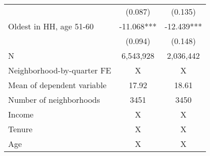 \begin{tabular}{lcc}
 & (0.087) & (0.135) \\ 
Oldest in HH, age 51-60 & -11.068*** & -12.439*** \\ 
 & (0.094) & (0.148) \\ 
 \midrule
N & 6,543,928 & 2,036,442 \\ 
Neighborhood-by-quarter FE & X & X \\ 
Mean of dependent variable & 17.92 & 18.61 \\ 
Number of neighborhoods & 3451 & 3450 \\ 
Income & X & X \\ 
Tenure & X & X \\ 
Age & X & X \\ 
\bottomrule
\end{tabular}